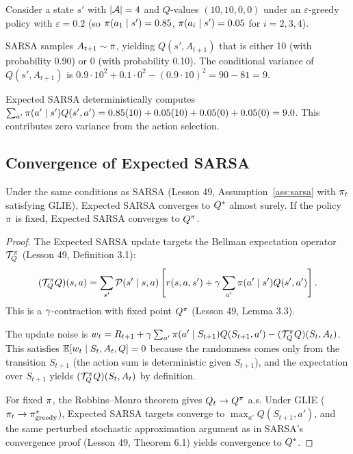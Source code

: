 \documentclass[11pt,a4paper]{article}
\begin{document}
\begin{example}
\label{ex:esarsa_variance}
Consider a state $s'$ with $|\mathcal{A}| = 4$ and $Q$-values
$(10, 10, 0, 0)$ under an $\varepsilon$-greedy policy with
$\varepsilon = 0.2$ (so $\pi(a_1 \mid s') = 0.85$,
$\pi(a_i \mid s') = 0.05$ for $i = 2,3,4$).

SARSA samples $A_{t+1} \sim \pi$, yielding $Q(s', A_{t+1})$
that is either 10 (with probability 0.90) or 0 (with probability
0.10). The conditional variance of $Q(s', A_{t+1})$ is
$0.9 \cdot 10^2 + 0.1 \cdot 0^2 - (0.9 \cdot 10)^2 = 90 - 81 = 9$.

Expected SARSA deterministically computes
$\sum_{a'} \pi(a' \mid s') Q(s', a')
= 0.85(10) + 0.05(10) + 0.05(0) + 0.05(0) = 9.0$.
This contributes zero variance from the action selection.
\end{example}

\subsection{Convergence of Expected SARSA}
\label{subsec:esarsa_convergence}

\begin{theorem}
\label{thm:esarsa}
Under the same conditions as SARSA (Lesson 49,
Assumption~\ref{ass:sarsa} with $\pi_t$ satisfying GLIE),
Expected SARSA converges to $Q^*$ almost surely. If the policy
$\pi$ is fixed, Expected SARSA converges to $Q^{\pi}$.
\end{theorem}

\begin{proof}
The Expected SARSA update targets the Bellman expectation operator
$\mathcal{T}^{\pi}_Q$ (Lesson 49, Definition 3.1):
\begin{equation}
  (\mathcal{T}^{\pi}_Q Q)(s,a)
  = \sum_{s'} \mathcal{P}(s' \mid s,a) \left[
    r(s,a,s') + \gamma \sum_{a'} \pi(a' \mid s') Q(s',a')
  \right].
  \label{eq:esarsa_operator}
\end{equation}
This is a $\gamma$-contraction with fixed point $Q^{\pi}$
(Lesson 49, Lemma 3.3).

The update noise is
$w_t = R_{t+1} + \gamma \sum_{a'} \pi(a' \mid S_{t+1})
Q(S_{t+1}, a') - (\mathcal{T}^{\pi}_Q Q)(S_t, A_t)$. This
satisfies $\mathbb{E}[w_t \mid S_t, A_t, Q] = 0$ because the randomness
comes only from the transition $S_{t+1}$ (the action sum is
deterministic given $S_{t+1}$), and the expectation over
$S_{t+1}$ yields $(\mathcal{T}^{\pi}_Q Q)(S_t, A_t)$ by
definition.

For fixed $\pi$, the Robbins--Monro theorem gives
$Q_t \to Q^{\pi}$ a.s. Under GLIE ($\pi_t \to \pi^*_{\text{greedy}}$),
Expected SARSA targets converge to
$\max_{a'} Q(S_{t+1}, a')$, and the same perturbed stochastic
approximation argument as in SARSA's convergence proof
(Lesson 49, Theorem 6.1) yields convergence to $Q^*$.
\end{proof}
\end{document}

